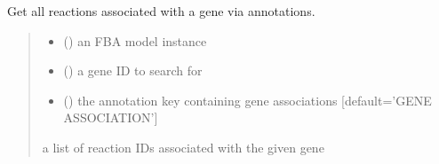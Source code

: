 \documentclass[letterpaper,12pt,english]{sphinxmanual}
\begin{document}
\begin{fulllineitems}
\label{\detokenize{api/core:cbmpy.CBTools.getAllReactionsAssociatedWithGene}}
\pysigstartsignatures
\pysiglinewithargsret
{}
{\sphinxparamcomma {}\sphinxparamcomma {}}
{}
\pysigstopsignatures
\sphinxAtStartPar
Get all reactions associated with a gene via annotations.
\begin{quote}\begin{description}
\begin{itemize}
\item {} 
\sphinxAtStartPar
{} () \textendash{} an FBA model instance

\item {} 
\sphinxAtStartPar
{} () \textendash{} a gene ID to search for

\item {} 
\sphinxAtStartPar
{} (\sphinxstyleliteralemphasis{\sphinxupquote{, }}) \textendash{} the annotation key containing gene associations {[}default=’GENE ASSOCIATION’{]}

\end{itemize}

\sphinxAtStartPar
{} \textendash{} a list of reaction IDs associated with the given gene

\end{description}\end{quote}

\end{fulllineitems}

\end{document}
